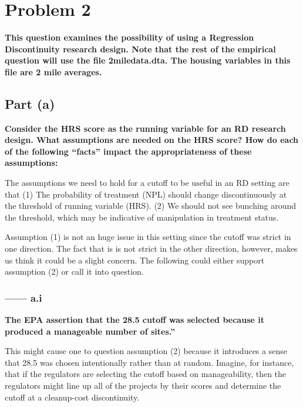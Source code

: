 \documentclass[
]{article}
\begin{document}
\newpage

\hypertarget{problem-2}{%
\section{Problem 2}\label{problem-2}}

\textbf{This question examines the possibility of using a Regression
Discontinuity research design. Note that the rest of the empirical
question will use the file 2miledata.dta. The housing variables in this
file are 2 mile averages.}

\hypertarget{part-a-1}{%
\subsection{Part (a)}\label{part-a-1}}

\textbf{Consider the HRS score as the running variable for an RD
research design. What assumptions are needed on the HRS score? How do
each of the following ``facts'' impact the appropriateness of these
assumptions:}

The assumptions we need to hold for a cutoff to be useful in an RD
setting are that (1) The probability of treatment (NPL) should change
discontinuously at the threshold of running variable (HRS). (2) We
should not see bunching around the threshold, which may be indicative of
manipulation in treatment status.

Assumption (1) is not an huge issue in this setting since the cutoff was
strict in one direction. The fact that is is not strict in the other
direction, however, makes us think it could be a slight concern. The
following could either support assumption (2) or call it into question.

\hypertarget{a.i}{%
\subsubsection{------ a.i}\label{a.i}}

\textbf{The EPA assertion that the 28.5 cutoff was selected because it
produced a manageable number of sites.'' }

This might cause one to question assumption (2) because it introduces a
sense that 28.5 was chosen intentionally rather than at random. Imagine,
for instance, that if the regulators are selecting the cutoff based on
manageability, then the regulators might line up all of the projects by
their scores and determine the cutoff at a cleanup-cost discontinuity.
\end{document}
